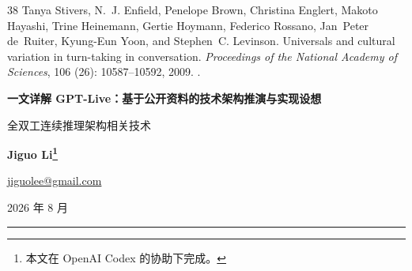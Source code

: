 \documentclass[UTF8,fontset=none,a4paper,10pt]{ctexart}
\renewcommand{\abstractname}{Abstract}
\renewcommand{\contentsname}{Contents}
\renewcommand{\figurename}{Figure}
\renewcommand{\tablename}{Table}
\renewcommand{\refname}{References}
\renewcommand{\appendixname}{Appendix}
\def\BilingualTocExtension{entoc}
\newcommand{\BilingualUseChineseToc}{\gdef\BilingualTocExtension{zhtoc}}
\def\BilingualAnchorPrefix{en}
\begin{document}
{\begin{thebibliography}{38}
Tanya Stivers, N.~J. Enfield, Penelope Brown, Christina Englert, Makoto
  Hayashi, Trine Heinemann, Gertie Hoymann, Federico Rossano, Jan~Peter
  de~Ruiter, Kyung-Eun Yoon, and Stephen~C. Levinson.
\newblock Universals and cultural variation in turn-taking in conversation.
\newblock \emph{Proceedings of the National Academy of Sciences}, 106
  (26): 10587--10592, 2009.
\newblock {}.

\end{thebibliography}
}
\clearpage
{}
\setcounter{section}{0}
\setcounter{subsection}{0}
\setcounter{subsubsection}{0}
\setcounter{equation}{0}
\setcounter{figure}{0}
\setcounter{table}{0}
\setcounter{footnote}{0}
\setcounter{tocdepth}{2}
\renewcommand{\abstractname}{摘要}
\renewcommand{\contentsname}{目录}
\renewcommand{\figurename}{图}
\renewcommand{\tablename}{表}
\renewcommand{\refname}{参考文献}
\renewcommand{\appendixname}{附录}
\BilingualUseChineseToc
\renewcommand*{\theHsection}{zh.\arabic{section}}
\renewcommand*{\theHsubsection}{zh.\arabic{section}.\arabic{subsection}}
\renewcommand*{\theHsubsubsection}{zh.\arabic{section}.\arabic{subsection}.\arabic{subsubsection}}
\renewcommand*{\theHequation}{zh.\arabic{equation}}
\renewcommand*{\theHfigure}{zh.\arabic{figure}}
\renewcommand*{\theHtable}{zh.\arabic{table}}
\gdef\BilingualAnchorPrefix{zh}
\markboth{}{}
\begin{center}
  {\bfseries\color{navy} 一文详解 GPT-Live：基于公开资料的技术架构推演与实现设想}\par
  \vspace{4pt}
  {\color{navy} 全双工连续推理架构相关技术}\par
  \vspace{10pt}
  {\normalsize\textbf{Jiguo Li\footnote{本文在 OpenAI Codex 的协助下完成。}}}\par
  \vspace{2pt}
  {\small\href{mailto:jiguolee@gmail.com}{jiguolee@gmail.com}}\par
  \vspace{2pt}
  {\small 2026 年 8 月}
\end{center}
\vspace{5pt}
\hrule
\end{document}
